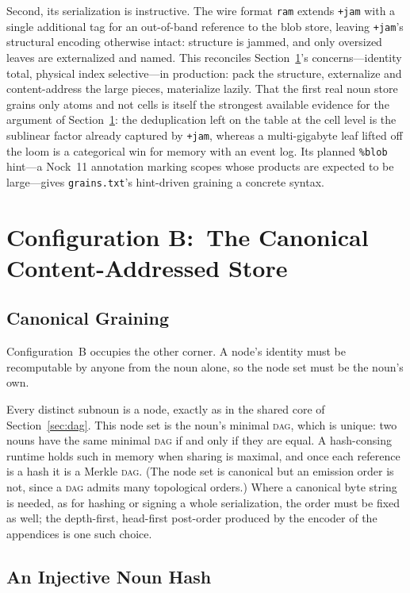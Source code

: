 \documentclass[twoside]{article}
\begin{document}
Second, its serialization is instructive.  The wire format \texttt{ram} extends \texttt{+jam} with a single additional tag for an out-of-band reference to the blob store, leaving \texttt{+jam}'s structural encoding otherwise intact:  structure is jammed, and only oversized leaves are externalized and named.  This reconciles Section~\ref{sec:cas}'s concerns---identity total, physical index selective---in production:  pack the structure, externalize and content-address the large pieces, materialize lazily.  That the first real noun store grains only atoms and not cells is itself the strongest available evidence for the argument of Section~\ref{sec:cas}:  the deduplication left on the table at the cell level is the sublinear factor already captured by \texttt{+jam}, whereas a multi-gigabyte leaf lifted off the loom is a categorical win for memory with an event log.  Its planned \texttt{\%blob} hint---a Nock~11 annotation marking scopes whose products are expected to be large---gives \texttt{grains.txt}'s hint-driven graining a concrete syntax.

\section[Configuration B]{Configuration B:\ The Canonical Content-Addressed Store}
\label{sec:cas}

\subsection{Canonical Graining}

Configuration~B occupies the other corner.  A node's identity must be recomputable by anyone from the noun alone, so the node set must be the noun's own.

Every distinct subnoun is a node, exactly as in the shared core of Section~\ref{sec:dag}.  This node set is the noun's minimal \textsc{dag}, which is unique:  two nouns have the same minimal \textsc{dag} if and only if they are equal.  A hash-consing runtime holds such in memory when sharing is maximal, and once each reference is a hash it is a Merkle \textsc{dag}.  (The node set is canonical but an emission order is not, since a \textsc{dag} admits many topological orders.)  Where a canonical byte string is needed, as for hashing or signing a whole serialization, the order must be fixed as well; the depth-first, head-first post-order produced by the encoder of the appendices is one such choice.

\subsection{An Injective Noun Hash}
\end{document}
